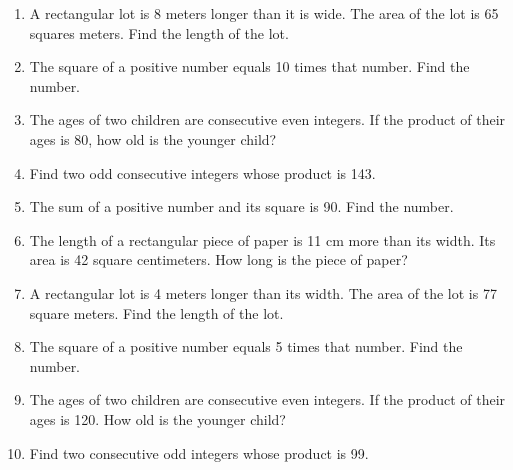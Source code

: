     \begin{enumerate}
    	\item A rectangular lot is 8 meters longer than it is wide. The area of the lot is 65 squares meters. Find the length of the lot.
       	\item The square of a positive number equals 10 times that number. Find the number.
    	\item The ages of two children are consecutive even integers. If the product of their ages is	80, how old is the younger child?
    	\item Find two odd consecutive integers whose product is 143.
    	\item The sum of a positive number and its square is 90. Find the number.
    	\item The length of a rectangular piece of paper is 11 cm more than its width. Its area is 42 square centimeters. How long is the piece of paper?
    	\item A rectangular lot is 4 meters longer than its width. The area of the lot is 77 square meters. Find the length of the lot.
    	\item The square of a positive number equals 5 times that number. Find the number.
    	\item The ages of two children are consecutive even integers. If the product of their ages is	120. How old is the younger child?
    	\item Find two consecutive odd integers whose product is 99.
    \end{enumerate}

    \newpage
    
